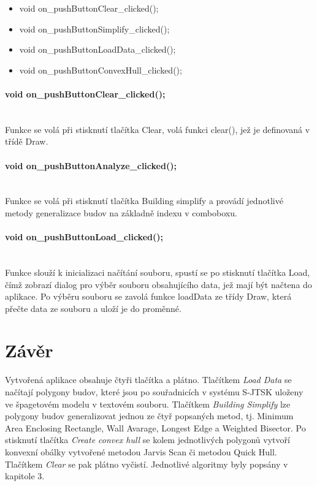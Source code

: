 \documentclass[11pt]{article}
\begin{document}
 	\begin{itemize}
 		\item void on\_pushButtonClear\_clicked();
 		\item void on\_pushButtonSimplify\_clicked();
 		\item void on\_pushButtonLoadData\_clicked();
 		\item void on\_pushButtonConvexHull\_clicked();
 		
 	\end{itemize}
 	
 	\paragraph{ void on\_pushButtonClear\_clicked();}\mbox{}\\
 	Funkce se volá při stisknutí tlačítka Clear, volá funkci clear(), jež je definovaná v třídě Draw.
 	
 	\paragraph{ void on\_pushButtonAnalyze\_clicked();}\mbox{}\\
 	Funkce se volá při stisknutí tlačítka Building simplify a provádí jednotlivé metody generalizace budov na základně indexu v comboboxu. 
 	
 	\paragraph{void on\_pushButtonLoad\_clicked();}\mbox{}\\
 	Funkce slouží k inicializaci načítání souboru, spustí se po stisknutí tlačítka Load, čímž zobrazí dialog pro výběr souboru obsahujícího data, jež mají být načtena do aplikace. Po výběru souboru se zavolá funkce loadData ze třídy Draw, která přečte data ze souboru a uloží je do proměnné.
 	
	
	
	\section{Závěr}
	Vytvořená aplikace obsahuje čtyři tlačítka a plátno. Tlačítkem \textit{Load Data} se načítají polygony budov, které jsou po souřadnicích v systému S-JTSK uloženy ve špagetovém modelu v textovém souboru. Tlačítkem \textit{Building Simplify} lze polygony budov generalizovat jednou ze čtyř popsaných metod, tj. Minimum Area Enclosing Rectangle, Wall Avarage, Longest Edge a Weighted Bisector. Po stisknutí tlačítka \textit{Create convex hull} se kolem jednotlivých polygonů vytvoří konvexní obálky vytvořené metodou Jarvis Scan či metodou Quick Hull. Tlačítkem \textit{Clear} se pak plátno vyčistí. Jednotlivé algoritmy byly popsány v kapitole 3.	
		
		

		
	
\end{document}
